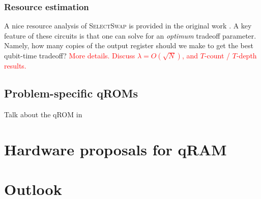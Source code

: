 \documentclass[a4paper,12pt]{article}
\newcommand\todo[1]{\textcolor{red}{#1}}
\begin{document}
\subsubsection{Resource estimation}

A nice resource analysis of \textsc{SelectSwap} is provided in the original work \cite{Vadym2018}.
A key feature of these circuits is that one can solve for an \emph{optimum} tradeoff parameter.
Namely, how many copies of the output register should we make to get the best qubit-time tradeoff?
\todo{More details. Discuss $\lambda = O(\sqrt{N})$, and $T$-count / $T$-depth results.}

\subsection{Problem-specific qROMs}

Talk about the qROM in \cite{Babbush2018}

\section{Hardware proposals for qRAM}
\label{sec:hardware}




\section{Outlook}
\label{sec:outlook}

\end{document}
